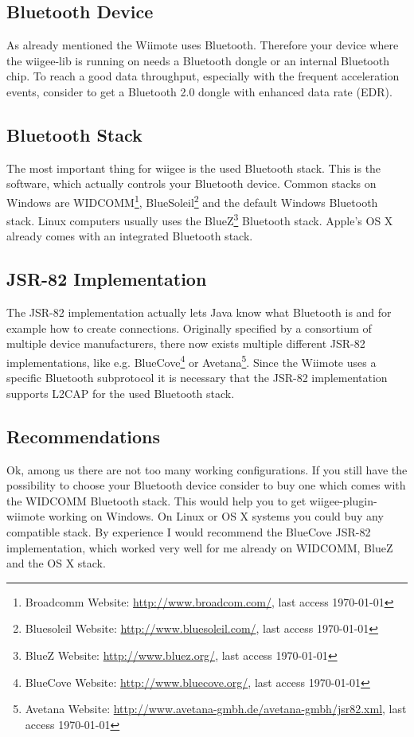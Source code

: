 \documentclass[%
   11pt,              %
   english,           %
   a4paper,           %
   DIV11,             %
   BCOR12mm,		  %
   titlepage,		  %
   bibtotoc,		  %
   liststotoc,		  %
   final,			  %
   twoside,			  %
   openright,		  %
   cleardoubleempty   %
]{scrreprt}%
\begin{document}
\subsection{Bluetooth Device}
As already mentioned the Wiimote uses Bluetooth. Therefore your device where the wiigee-lib is running on needs a Bluetooth dongle or an internal Bluetooth chip. To reach a good data throughput, especially with the frequent acceleration events, consider to get a Bluetooth 2.0 dongle with enhanced data rate (EDR).

\subsection{Bluetooth Stack}
The most important thing for wiigee is the used Bluetooth stack. This is the software, which actually controls your Bluetooth device. Common stacks on Windows are WIDCOMM\footnote{Broadcomm Website: \url{http://www.broadcom.com/}, last access \today}, BlueSoleil\footnote{Bluesoleil Website: \url{http://www.bluesoleil.com/}, last access \today} and the default Windows Bluetooth stack. Linux computers usually uses the BlueZ\footnote{BlueZ Website: \url{http://www.bluez.org/}, last access \today} Bluetooth stack. Apple's OS X already comes with an integrated Bluetooth stack.

\subsection{JSR-82 Implementation}
The JSR-82 implementation actually lets Java know what Bluetooth is and for example how to create connections. Originally specified by a consortium of multiple device manufacturers, there now exists multiple different JSR-82 implementations, like e.g. BlueCove\footnote{BlueCove Website: \url{http://www.bluecove.org/}, last access \today} or Avetana\footnote{Avetana Website: \url{http://www.avetana-gmbh.de/avetana-gmbh/jsr82.xml}, last access \today}. Since the Wiimote uses a specific Bluetooth subprotocol it is necessary that the JSR-82 implementation supports L2CAP for the used Bluetooth stack.

\subsection{Recommendations}
Ok, among us there are not too many working configurations. If you still have the possibility to choose your Bluetooth device consider to buy one which comes with the WIDCOMM Bluetooth stack. This would help you to get wiigee-plugin-wiimote working on Windows. On Linux or OS X systems you could buy any compatible stack. By experience I would recommend the BlueCove JSR-82 implementation, which worked very well for me already on WIDCOMM, BlueZ and the OS X stack.
\end{document}
